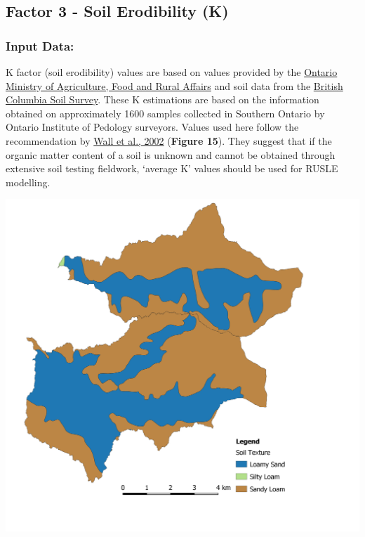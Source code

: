 \documentclass[
]{article}
\begin{document}
\hypertarget{sec-factor-3}{%
\subsection*{Factor 3 - Soil Erodibility (K)}\label{sec-factor-3}}

\hypertarget{sec-input-data-ls}{%
\subsubsection*{Input Data:}\label{sec-input-data-ls}}

K factor (soil erodibility) values are based on values provided by the \href{http://www.omafra.gov.on.ca/english/engineer/facts/12-051.htm}{Ontario Ministry of Agriculture, Food and Rural Affairs} and soil data from the \href{https://catalogue.data.gov.bc.ca/dataset/20150a67-5a2d-425f-8216-ff0f97f68df9}{British Columbia Soil Survey}. These K estimations are based on the information obtained on approximately 1600 samples collected in Southern Ontario by Ontario Institute of Pedology surveyors. Values used here follow the recommendation by \href{https://sis.agr.gc.ca/cansis/publications/manuals/2002-92/rusle-can.pdf}{Wall et al., 2002} (\textbf{Figure 15}). They suggest that if the organic matter content of a soil is unknown and cannot be obtained through extensive soil testing fieldwork, `average K' values should be used for RUSLE modelling.

\includegraphics{img/k_factor_input.png}
\end{document}
